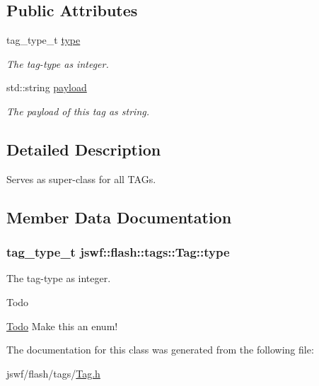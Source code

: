 \subsection*{Public Attributes}
\begin{DoxyCompactItemize}
\item 
tag\+\_\+type\+\_\+t \hyperlink{classjswf_1_1flash_1_1tags_1_1_tag_a3152409242986a8c0c89156f1dabc5e2}{type}
\begin{DoxyCompactList}\small\item\em The tag-\/type as integer. \end{DoxyCompactList}\item 
\hypertarget{classjswf_1_1flash_1_1tags_1_1_tag_a56525f85068803819fa64e868801c492}{std\+::string \hyperlink{classjswf_1_1flash_1_1tags_1_1_tag_a56525f85068803819fa64e868801c492}{payload}}\label{classjswf_1_1flash_1_1tags_1_1_tag_a56525f85068803819fa64e868801c492}

\begin{DoxyCompactList}\small\item\em The payload of this tag as string. \end{DoxyCompactList}\end{DoxyCompactItemize}


\subsection{Detailed Description}
Serves as super-\/class for all {\ttfamily T\+A\+G}s. 

\subsection{Member Data Documentation}
\hypertarget{classjswf_1_1flash_1_1tags_1_1_tag_a3152409242986a8c0c89156f1dabc5e2}{
\subsubsection[{type}]{\setlength{\rightskip}{0pt plus 5cm}tag\+\_\+type\+\_\+t jswf\+::flash\+::tags\+::\+Tag\+::type}}\label{classjswf_1_1flash_1_1tags_1_1_tag_a3152409242986a8c0c89156f1dabc5e2}


The tag-\/type as integer. 

\begin{DoxyRefDesc}{Todo}
\item[\hyperlink{todo__todo000020}{Todo}]Make this an enum! \end{DoxyRefDesc}


The documentation for this class was generated from the following file\+:\begin{DoxyCompactItemize}
\item 
jswf/flash/tags/\hyperlink{_tag_8h}{Tag.\+h}\end{DoxyCompactItemize}
